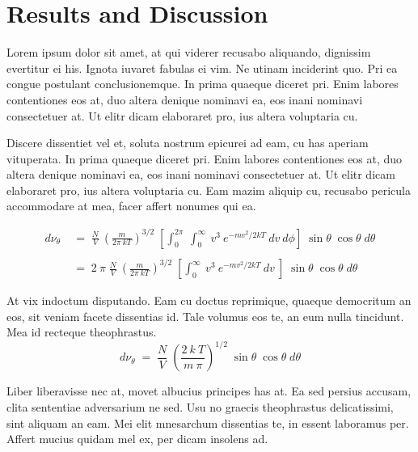 \cleartooddpage[\thispagestyle{empty}]
\chapter{Results and Discussion}\label{CHAPTER3}

Lorem ipsum dolor sit amet, at qui viderer recusabo aliquando, dignissim 
evertitur ei his. Ignota iuvaret fabulas ei vim. Ne utinam inciderint quo. 
Pri ea congue postulant conclusionemque. In prima quaeque diceret pri. Enim 
labores contentiones eos at, duo altera denique nominavi ea, eos inani 
nominavi consectetuer at. Ut elitr dicam elaboraret pro, ius altera 
voluptaria cu.

Discere dissentiet vel et, soluta nostrum epicurei ad eam, cu has aperiam 
vituperata. In prima quaeque diceret pri. Enim labores contentiones eos at, 
duo altera denique nominavi ea, eos inani nominavi consectetuer at. Ut elitr 
dicam elaboraret pro, ius altera voluptaria cu. Eam mazim aliquip cu, 
recusabo pericula accommodare at mea, facer affert nonumes qui ea.
\cite{LAPACK_00,FFTW3_00}

\begin{align*}
  d\nu_\theta &\;=\; \frac{N}{V}\:\left( \frac{m}{2\pi\:kT} \right)^{3/2}\;
                    \left[\int_{0}^{2\pi}\:\int_{0}^{\infty}\:v^3\:e^{-mv^2/2kT}\:dv\:d\phi \right]\;
                    \sin\theta\;\cos\theta\;d\theta \\\\
              &\;=\; 2\:\pi\;
                    \frac{N}{V}\:\left( \frac{m}{2\pi\:kT} \right)^{3/2}\;
                    \left[\int_{0}^{\infty}\:v^3\:e^{-mv^2/2kT}\:dv\: \right]\;
                    \sin\theta\;\cos\theta\;d\theta
\end{align*}

At vix indoctum disputando. Eam cu doctus reprimique, quaeque democritum 
an eos, sit veniam facete dissentias id. Tale volumus eos te, an eum nulla 
tincidunt. Mea id recteque theophrastus.
\begin{equation}
  d\nu_\theta \;=\; \frac{N}{V}\;\left(\frac{2\:k\:T}{m\:\pi} \right)^{1/2}\;
                  \sin\theta\;\cos\theta\;d\theta
  \label{CHAPTER3_EQN01}
\end{equation}

Liber liberavisse nec at, movet albucius principes has at. Ea sed persius 
accusam, clita sententiae adversarium ne sed. Usu no graecis theophrastus 
delicatissimi, sint aliquam an eam. Mei elit mnesarchum dissentias te, in 
essent laboramus per. Affert mucius quidam mel ex, per dicam insolens ad.

